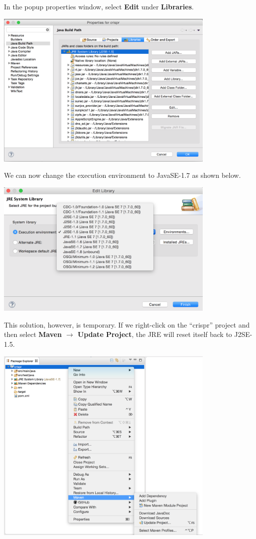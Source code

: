 In the popup properties window, select {\bf Edit} under {\bf Libraries}. 
\begin{center}
  \includegraphics[width=0.8\textwidth]{figures/createNewMavenProject8}
\end{center}

We can now change the execution environment to JavaSE-1.7 as shown below. 
\begin{center}
  \includegraphics[width=0.8\textwidth]{figures/createNewMavenProject9}
\end{center}

This solution, however, is temporary. If we right-click on the ``crispr'' project and then select {\bf Maven $\rightarrow$  Update Project}, the JRE will reset itself back to J2SE-1.5. 
\begin{center}
  \includegraphics[width=0.8\textwidth]{figures/createNewMavenProject10}
\end{center}

